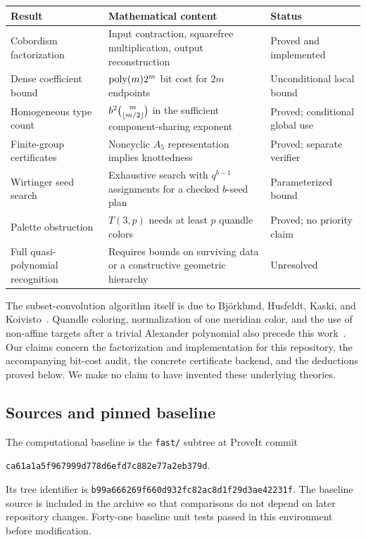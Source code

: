 \begin{center}
\small
\begin{tabular}{P{.26\linewidth}P{.40\linewidth}P{.23\linewidth}}
\toprule
Result & Mathematical content & Status \\
\midrule
Cobordism factorization & Input contraction, squarefree multiplication,
output reconstruction & Proved and implemented \\
Dense coefficient bound & $\operatorname{poly}(m)2^m$ bit cost for $2m$ endpoints &
Unconditional local bound \\
Homogeneous type count & $b^2\binom{m}{\left\lfloor m/2\right\rfloor}$ in the sufficient
component-sharing exponent & Proved; conditional global use \\
Finite-group certificates & Noncyclic $A_5$ representation implies knottedness &
Proved; separate verifier \\
Wirtinger seed search & Exhaustive search with $q^{b-1}$ assignments for a
checked $b$-seed plan & Parameterized bound \\
Palette obstruction & $T(3,p)$ needs at least $p$ quandle colors &
Proved; no priority claim \\
Full quasi-polynomial recognition & Requires bounds on surviving data or a
constructive geometric hierarchy & Unresolved \\
\bottomrule
\end{tabular}
\end{center}

The subset-convolution algorithm itself is due to Bj\"orklund, Husfeldt,
Kaski, and Koivisto~\cite{bhkk}. Quandle coloring, normalization of one
meridian color, and the use of non-affine targets after a trivial Alexander
polynomial also precede this work~\cite{clark,fish}. Our claims concern the
factorization and implementation for this repository, the accompanying
bit-cost audit, the concrete certificate backend, and the deductions proved
below. We make no claim to have invented these underlying theories.

\subsection{Sources and pinned baseline}

The computational baseline is the \texttt{fast/} subtree at ProveIt commit
\begin{center}
\texttt{ca61a1a5f967999d778d6efd7c882e77a2eb379d}.
\end{center}
Its tree identifier is
\texttt{b99a666269f660d932fc82ac8d1f29d3ae42231f}. The baseline source is
included in the archive so that comparisons do not depend on later
repository changes. Forty-one baseline unit tests passed in this
environment before modification.

